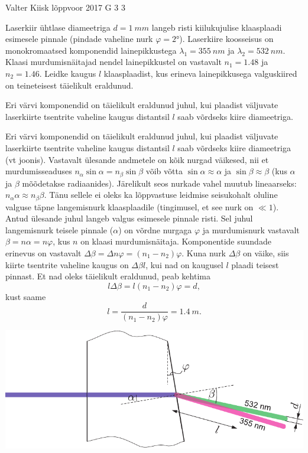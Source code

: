 {Valter Kiisk} %
{lõppvoor} %
{2017} %
{G 3} %
{3} %
{
\ifStatement
Laserkiir ühtlase diameetriga $d=\SI{1}{mm}$ langeb risti kiilukujulise klaasplaadi esimesele pinnale (pindade vaheline nurk $\varphi=\ang{2}$). Laserkiire koosseisus on monokromaatsed komponendid lainepikkustega $\lambda_1=\SI{355}{nm}$ ja $\lambda_2=\SI{532}{nm}$. Klaasi murdumisnäitajad nendel lainepikkustel on vastavalt $n_1=\num{1.48}$ ja $n_2=\num{1.46}$. Leidke kaugus $l$ klaasplaadist, kus erineva lainepikkusega valguskiired on teineteisest täielikult eraldunud.
\fi


\ifHint
Eri värvi komponendid on täielikult eraldunud juhul, kui plaadist väljuvate laserkiirte tsentrite vaheline kaugus distantsil $l$ saab võrdseks kiire diameetriga.
\fi


\ifSolution
Eri värvi komponendid on täielikult eraldunud juhul, kui plaadist väljuvate laserkiirte tsentrite vaheline kaugus distantsil $l$ saab võrdseks kiire diameetriga (vt joonis). Vastavalt ülesande andmetele on kõik nurgad väikesed, nii et murdumisseaduses $n_\alpha\sin\alpha=n_\beta\sin\beta$ võib võtta $\sin\alpha\approx\alpha$ ja $\sin\beta\approx\beta$ (kus $\alpha$ ja $\beta$ mõõdetakse radiaanides). Järelikult seos nurkade vahel muutub lineaarseks: $n_\alpha\alpha\approx n_\beta\beta$. Tänu sellele ei oleks ka lõppvastuse leidmise seisukohalt oluline valguse täpne langemisnurk klaasplaadile (tingimusel, et see nurk on $\ll 1$). Antud ülesande juhul langeb valgus esimesele pinnale risti. Sel juhul langemisnurk teisele pinnale ($\alpha$) on võrdne nurgaga $\varphi$ ja murdumisnurk vastavalt $\beta=n\alpha=n\varphi$, kus $n$ on klaasi murdumisnäitaja. Komponentide suundade erinevus on vastavalt $\Delta\beta=\Delta n\varphi=(n_1-n_2)\varphi$. Kuna nurk $\Delta\beta$ on väike, siis kiirte tsentrite vaheline kaugus on $\Delta\beta l$, kui nad on kaugusel $l$ plaadi teisest pinnast. Et nad oleks täielikult eraldunud, peab kehtima
\[
l\Delta\beta=l(n_1-n_2)\varphi=d,
\]
kust saame
\[
l = \frac{d}{(n_1-n_2)\varphi} = \SI{1.4}{m}.
\]

\begin{center}
	\includegraphics[width=0.93\linewidth]{2017-v3g-03-laser-lahend.pdf}
\end{center}
\fi


}
